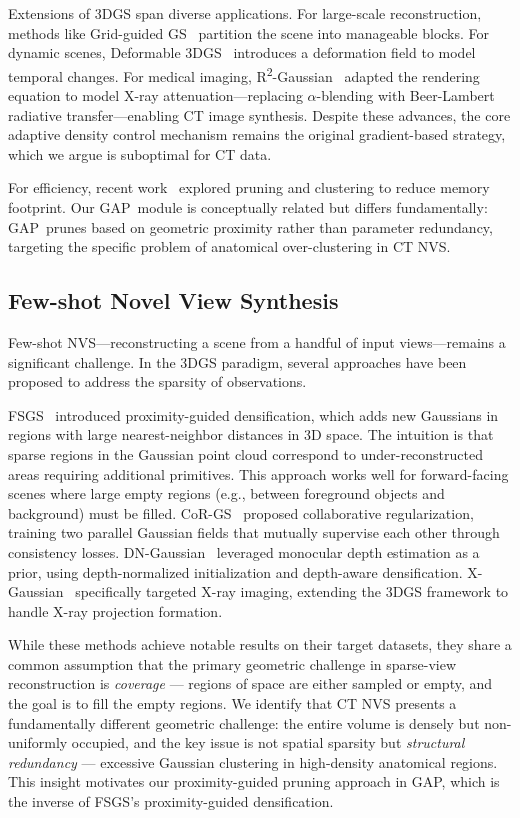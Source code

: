 \documentclass{egPublStyle}
\newcommand{\gap}{GAP}
\newcommand{\rtwo}{R\textsuperscript{2}-Gaussian}
\begin{document}
Extensions of 3DGS span diverse applications. For large-scale reconstruction, methods like Grid-guided GS~\cite{xu2024grid} partition the scene into manageable blocks. For dynamic scenes, Deformable 3DGS~\cite{wu2024deformable} introduces a deformation field to model temporal changes. For medical imaging, \rtwo~\cite{hu2024r2} adapted the rendering equation to model X-ray attenuation---replacing $\alpha$-blending with Beer-Lambert radiative transfer---enabling CT image synthesis. Despite these advances, the core adaptive density control mechanism remains the original gradient-based strategy, which we argue is suboptimal for CT data.

For efficiency, recent work~\cite{lu2024compact} explored pruning and clustering to reduce memory footprint. Our \gap\ module is conceptually related but differs fundamentally: \gap\ prunes based on geometric proximity rather than parameter redundancy, targeting the specific problem of anatomical over-clustering in CT NVS.

\subsection{Few-shot Novel View Synthesis}
Few-shot NVS---reconstructing a scene from a handful of input views---remains a significant challenge. In the 3DGS paradigm, several approaches have been proposed to address the sparsity of observations.

FSGS~\cite{zhu2024fsgs} introduced proximity-guided densification, which adds new Gaussians in regions with large nearest-neighbor distances in 3D space. The intuition is that sparse regions in the Gaussian point cloud correspond to under-reconstructed areas requiring additional primitives. This approach works well for forward-facing scenes where large empty regions (e.g., between foreground objects and background) must be filled. CoR-GS~\cite{zhang2024cor} proposed collaborative regularization, training two parallel Gaussian fields that mutually supervise each other through consistency losses. DN-Gaussian~\cite{li2024dn} leveraged monocular depth estimation as a prior, using depth-normalized initialization and depth-aware densification. X-Gaussian~\cite{cai2024xgaussian} specifically targeted X-ray imaging, extending the 3DGS framework to handle X-ray projection formation.

While these methods achieve notable results on their target datasets, they share a common assumption that the primary geometric challenge in sparse-view reconstruction is \textit{coverage} --- regions of space are either sampled or empty, and the goal is to fill the empty regions. We identify that CT NVS presents a fundamentally different geometric challenge: the entire volume is densely but non-uniformly occupied, and the key issue is not spatial sparsity but \textit{structural redundancy} --- excessive Gaussian clustering in high-density anatomical regions. This insight motivates our proximity-guided pruning approach in \gap, which is the inverse of FSGS's proximity-guided densification.
\end{document}
